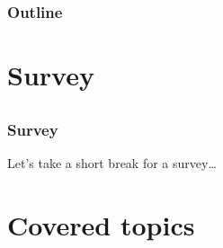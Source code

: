 \begin{frame}[plain,c]
  \titlepage
\end{frame}

\begin{frame}[t]
  \frametitle{Outline}

  \tableofcontents
\end{frame}

\section{Survey}
\subsection*{}

\begin{frame}
  \frametitle{Survey}

  \begin{center}
    \Large{}
    Let's take a short break for a survey\dots
  \end{center}
\end{frame}

\section{Covered topics}
\subsection*{}

